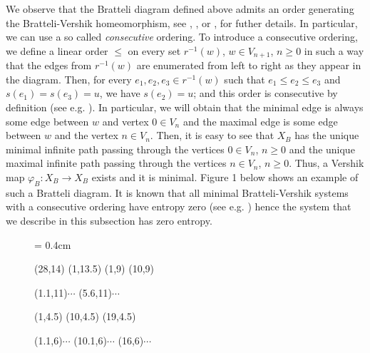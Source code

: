 \documentclass[11pt, english, reqno]{amsart}
\theoremstyle{definition}
\theoremstyle{remark}
\theoremstyle{plain}
\numberwithin{equation}{section}
\begin{document}
{  We observe that the Bratteli diagram defined above admits
 an order generating the Bratteli-Vershik homeomorphism, see
  \cite{HermanPutnamSkau1992}, \cite{GiordanoPutnamSkau1995}, or
\cite{BezuglyiKwiatkowskiYassawi2014}, \cite{BezuglyiKarpel2016} for
futher details. 
 In particular, we can use a so called \textit{consecutive} ordering. To 
 introduce a consecutive ordering, we define a linear 
 order $\leq$ on every set $r^{-1}(w)$, $w \in V_{n+1}$, $n  \geq 0$ in 
 such a way that the edges from $r^{-1}(w)$ are enumerated from left to 
 right as they appear in the diagram. Then, for every $e_1, e_2, e_3 \in r^{-1}(w)$ such that $e_1 \leq e_2 \leq e_3$ and $s(e_1) = s(e_3) = u$, 
 we have $s(e_2) = u$; and this order is consecutive by definition (see e.g.  \cite{Durand2010}). 
In particular, we will obtain that the minimal edge is  always  some edge 
between $w$ and vertex $0 \in V_{n}$ and the maximal edge is some edge 
between $w$  and the vertex $n \in V_n$.
  Then, it is easy to see that $X_B$ has the unique
 minimal infinite path passing through the vertices $0 \in V_n$, $n \geq 0$
 and the unique maximal infinite path passing through the vertices $n \in V_n
 $, $n \geq 0$. Thus, a Vershik map $\varphi_B \colon X_B \rightarrow
 X_B$ exists and it is minimal. Figure 1 below shows an example of such a 
 Bratteli  diagram. It is known that all minimal Bratteli-Vershik systems with a 
 consecutive ordering have entropy zero (see e.g. \cite{Durand2010}) hence 
 the system that we describe in this subsection has zero entropy.
 
\begin{figure}[ht]
\unitlength = 0.4cm
\begin{center}
\begin{graph}(28,14)
(1,13.5)
(1,9)
(10,9)


\freetext(1.1,11){$\cdots$}
\freetext(5.6,11){$\cdots$}

(1,4.5)
(10,4.5)
(19,4.5)

\freetext(1.1,6){$\cdots$}
\freetext(10.1,6){$\cdots$}
\freetext(16,6){$\cdots$}


\end{graph}
\end{center}
\end{figure}}
\end{document}
